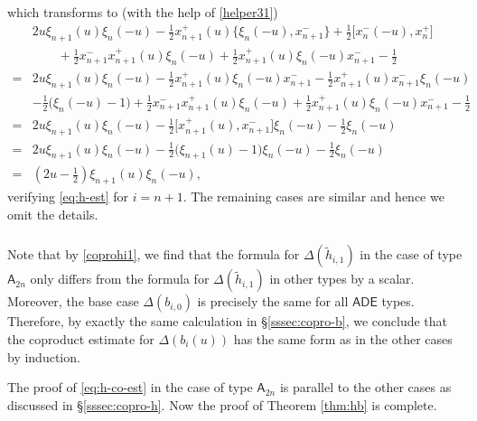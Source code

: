 \documentclass[11pt,reqno]{amsart}
\numberwithin{equation}{section}
\theoremstyle{definition}
\theoremstyle{remark}
\newcommand{\tl}{\tilde}
\begin{document}
which transforms to (with the help of \eqref{helper31})
\begin{align*}
&2u\xi_{n+1}(u)\xi_n(-u)
-\tfrac12x_{n+1}^+(u)\bigl\{\xi_n(-u),x_{n+1}^-\bigr\}
+\tfrac12\bigl[x_n^-(-u),x_n^+\bigr]\\
&\qquad
+\tfrac12x_{n+1}^-x_{n+1}^+(u)\xi_n(-u)
+\tfrac12x_{n+1}^+(u)\xi_n(-u)x_{n+1}^-
-\tfrac12\\
={}&
2u\xi_{n+1}(u)\xi_n(-u)
-\tfrac12x_{n+1}^+(u)\xi_n(-u)x_{n+1}^-
-\tfrac12x_{n+1}^+(u)x_{n+1}^-\xi_n(-u)\\
&
-\tfrac12\bigl(\xi_n(-u)-1\bigr)
+\tfrac12x_{n+1}^-x_{n+1}^+(u)\xi_n(-u)
+\tfrac12x_{n+1}^+(u)\xi_n(-u)x_{n+1}^-
-\tfrac12\\
={}&
2u\xi_{n+1}(u)\xi_n(-u)
-\tfrac12\bigl[x_{n+1}^+(u),x_{n+1}^-\bigr]\xi_n(-u)
-\tfrac12\xi_n(-u)\\
={}&
2u\xi_{n+1}(u)\xi_n(-u)
-\tfrac12\bigl(\xi_{n+1}(u)-1\bigr)\xi_n(-u)
-\tfrac12\xi_n(-u)\\
={}&\left(2u-\tfrac12\right)\xi_{n+1}(u)\xi_n(-u),
\end{align*}
verifying \eqref{eq:h-est} for $i=n+1$. The remaining cases are similar and hence we omit the details.

\subsubsection{}
Note that by \eqref{coprohi1}, we find that the formula for $\Delta(\tl h_{i,1})$ in the case of type $\mathsf A_{2n}$ only differs from the formula for $\Delta(\tl h_{i,1})$ in other types by a scalar. Moreover, the base case $\Delta(b_{i,0})$ is precisely the same for all $\mathsf{ADE}$ types. Therefore, by exactly the same calculation in \S\ref{sssec:copro-b}, we conclude that the coproduct estimate for $\Delta(b_i(u))$ has the same form as in the other cases by induction.

The proof of \eqref{eq:h-co-est} in the case of type $\mathsf A_{2n}$ is parallel to the other cases as discussed in \S\ref{sssec:copro-h}. Now the proof of Theorem \ref{thm:hb} is complete.

\appendix
\end{document}

